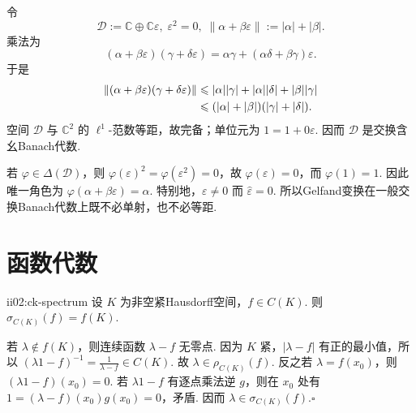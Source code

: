 \begin{FACounterexample}\label{ii02:dual-number}
令
\[
\mathcal D
:=
\mathbb C\oplus\mathbb C\varepsilon,
\;
\varepsilon^2=0,
\;
\|\alpha+\beta\varepsilon\|:=|\alpha|+|\beta|.
\]
乘法为
\[
(\alpha+\beta\varepsilon)(\gamma+\delta\varepsilon)
=
\alpha\gamma+(\alpha\delta+\beta\gamma)\varepsilon.
\]
于是
\[
\begin{aligned}
\displaystyle \|(\alpha+\beta\varepsilon)(\gamma+\delta\varepsilon)\| &\displaystyle \leqslant |\alpha||\gamma|+|\alpha||\delta|+|\beta||\gamma|\\
\displaystyle &\displaystyle \leqslant (|\alpha|+|\beta|)(|\gamma|+|\delta|).
\end{aligned}
\]
空间 \(\displaystyle\mathcal D\) 与 \(\displaystyle\mathbb C^2\) 的 \(\displaystyle\ell^1\)-范数等距，故完备；单位元为 \(\displaystyle1=1+0\varepsilon\). 因而 \(\displaystyle\mathcal D\) 是交换含幺Banach代数.

若 \(\displaystyle\varphi\in\Delta(\mathcal D)\)，则 \(\displaystyle\varphi(\varepsilon)^2=\varphi(\varepsilon^2)=0\)，故 \(\displaystyle\varphi(\varepsilon)=0\)，而 \(\displaystyle\varphi(1)=1\). 因此唯一角色为
\(\displaystyle \varphi(\alpha+\beta\varepsilon)=\alpha.\)
特别地，\(\displaystyle\varepsilon\neq0\) 而 \(\displaystyle\widehat\varepsilon=0\). 所以Gelfand变换在一般交换Banach代数上既不必单射，也不必等距.
\end{FACounterexample}

\section{函数代数}\label{sec:ii02-function-algebras}

\begin{FAProposition}{ii02:ck-spectrum}
设 \(\displaystyle K\) 为非空紧Hausdorff空间，\(\displaystyle f\in C(K)\). 则
\(\displaystyle \sigma_{C(K)}(f)=f(K).\)
\end{FAProposition}

\begin{FAProof}
若 \(\displaystyle\lambda\notin f(K)\)，则连续函数 \(\displaystyle\lambda-f\) 无零点. 因为 \(\displaystyle K\) 紧，\(\displaystyle |\lambda-f|\) 有正的最小值，所以
\(\displaystyle (\lambda1-f)^{-1} = \frac{1}{\lambda-f} \in C(K).\)
故 \(\displaystyle\lambda\in\rho_{C(K)}(f)\). 反之若 \(\displaystyle\lambda=f(x_0)\)，则 \(\displaystyle(\lambda1-f)(x_0)=0\). 若 \(\displaystyle\lambda1-f\) 有逐点乘法逆 \(\displaystyle g\)，则在 \(\displaystyle x_0\) 处有 \(\displaystyle1=(\lambda-f)(x_0)g(x_0)=0\)，矛盾. 因而 \(\displaystyle\lambda\in\sigma_{C(K)}(f)\).\hfill\(\square\)
\end{FAProof}


